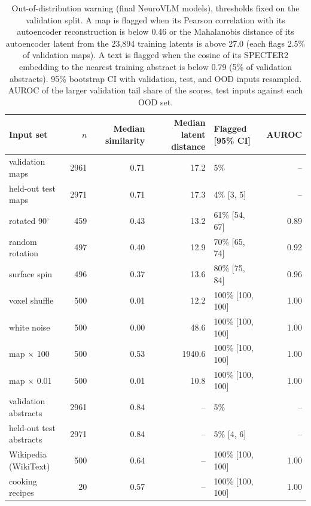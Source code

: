 \begin{table}[ht]
\centering
\small
\caption{Out-of-distribution warning (final NeuroVLM models), thresholds fixed on the validation split. A map is flagged when its Pearson correlation with its autoencoder reconstruction is below 0.46 or the Mahalanobis distance of its autoencoder latent from the 23,894 training latents is above 27.0 (each flags 2.5\% of validation maps). A text is flagged when the cosine of its SPECTER2 embedding to the nearest training abstract is below 0.79 (5\% of validation abstracts). 95\% bootstrap CI with validation, test, and OOD inputs resampled. AUROC of the larger validation tail share of the scores, test inputs against each OOD set.}
\label{tab:a7_ood}
\begin{tabular}{lrrrlr}
\toprule
Input set & $n$ & Median similarity & Median latent distance & Flagged [95\% CI] & AUROC \\
\midrule
validation maps & 2961 & 0.71 & 17.2 & 5\% & -- \\
held-out test maps & 2971 & 0.71 & 17.3 & 4\% [3, 5] & -- \\
rotated 90$^\circ$ & 459 & 0.43 & 13.2 & 61\% [54, 67] & 0.89 \\
random rotation & 497 & 0.40 & 12.9 & 70\% [65, 74] & 0.92 \\
surface spin & 496 & 0.37 & 13.6 & 80\% [75, 84] & 0.96 \\
voxel shuffle & 500 & 0.01 & 12.2 & 100\% [100, 100] & 1.00 \\
white noise & 500 & 0.00 & 48.6 & 100\% [100, 100] & 1.00 \\
map $\times$ 100 & 500 & 0.53 & 1940.6 & 100\% [100, 100] & 1.00 \\
map $\times$ 0.01 & 500 & 0.01 & 10.8 & 100\% [100, 100] & 1.00 \\
\midrule
validation abstracts & 2961 & 0.84 & -- & 5\% & -- \\
held-out test abstracts & 2971 & 0.84 & -- & 5\% [4, 6] & -- \\
Wikipedia (WikiText) & 500 & 0.64 & -- & 100\% [100, 100] & 1.00 \\
cooking recipes & 20 & 0.57 & -- & 100\% [100, 100] & 1.00 \\
\bottomrule
\end{tabular}
\end{table}
